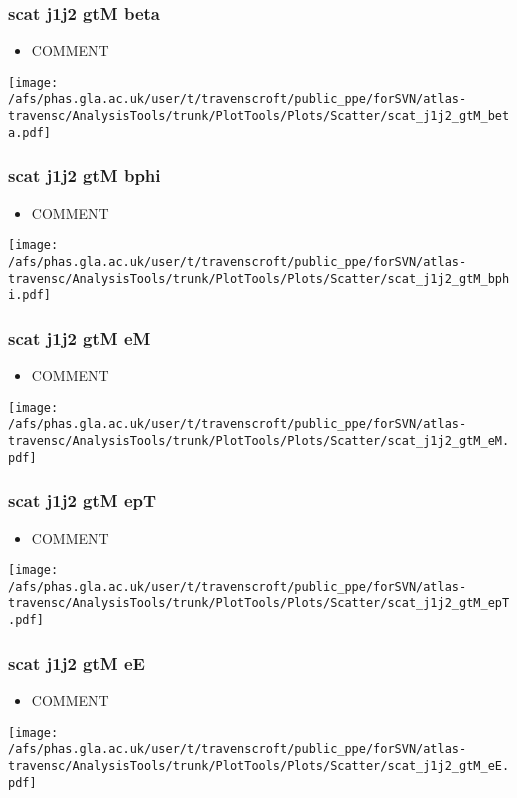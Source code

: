 \documentclass{beamer}
\begin{document}
\begin{frame}
\frametitle{scat j1j2 gtM beta}
\begin{itemize}
\item COMMENT
\end{itemize}
\begin{center}
\texttt{[image: /afs/phas.gla.ac.uk/user/t/travenscroft/public\_ppe/forSVN/atlas-travensc/AnalysisTools/trunk/PlotTools/Plots/Scatter/scat\_j1j2\_gtM\_beta.pdf]}
\end{center}
\end{frame}

\begin{frame}
\frametitle{scat j1j2 gtM bphi}
\begin{itemize}
\item COMMENT
\end{itemize}
\begin{center}
\texttt{[image: /afs/phas.gla.ac.uk/user/t/travenscroft/public\_ppe/forSVN/atlas-travensc/AnalysisTools/trunk/PlotTools/Plots/Scatter/scat\_j1j2\_gtM\_bphi.pdf]}
\end{center}
\end{frame}

\begin{frame}
\frametitle{scat j1j2 gtM eM}
\begin{itemize}
\item COMMENT
\end{itemize}
\begin{center}
\texttt{[image: /afs/phas.gla.ac.uk/user/t/travenscroft/public\_ppe/forSVN/atlas-travensc/AnalysisTools/trunk/PlotTools/Plots/Scatter/scat\_j1j2\_gtM\_eM.pdf]}
\end{center}
\end{frame}

\begin{frame}
\frametitle{scat j1j2 gtM epT}
\begin{itemize}
\item COMMENT
\end{itemize}
\begin{center}
\texttt{[image: /afs/phas.gla.ac.uk/user/t/travenscroft/public\_ppe/forSVN/atlas-travensc/AnalysisTools/trunk/PlotTools/Plots/Scatter/scat\_j1j2\_gtM\_epT.pdf]}
\end{center}
\end{frame}

\begin{frame}
\frametitle{scat j1j2 gtM eE}
\begin{itemize}
\item COMMENT
\end{itemize}
\begin{center}
\texttt{[image: /afs/phas.gla.ac.uk/user/t/travenscroft/public\_ppe/forSVN/atlas-travensc/AnalysisTools/trunk/PlotTools/Plots/Scatter/scat\_j1j2\_gtM\_eE.pdf]}
\end{center}
\end{frame}
\end{document}
